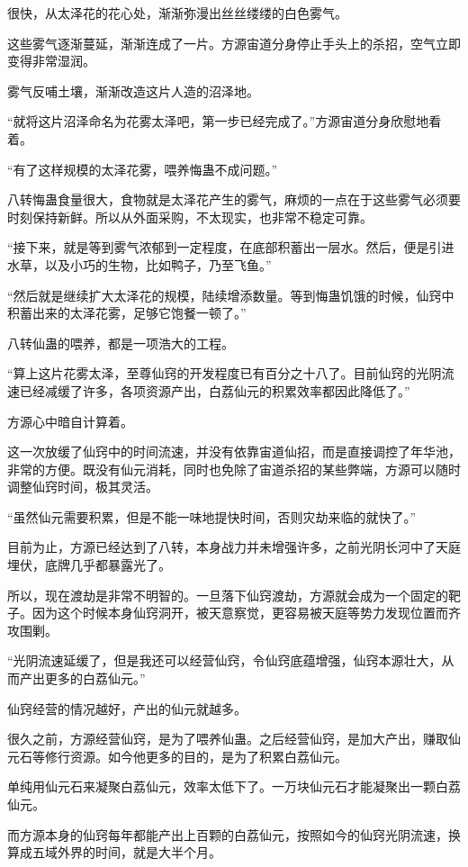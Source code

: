 \begin{this_body}
很快，从太泽花的花心处，渐渐弥漫出丝丝缕缕的白色雾气。

这些雾气逐渐蔓延，渐渐连成了一片。方源宙道分身停止手头上的杀招，空气立即变得非常湿润。

雾气反哺土壤，渐渐改造这片人造的沼泽地。

“就将这片沼泽命名为花雾太泽吧，第一步已经完成了。”方源宙道分身欣慰地看着。

“有了这样规模的太泽花雾，喂养悔蛊不成问题。”

八转悔蛊食量很大，食物就是太泽花产生的雾气，麻烦的一点在于这些雾气必须要时刻保持新鲜。所以从外面采购，不太现实，也非常不稳定可靠。

“接下来，就是等到雾气浓郁到一定程度，在底部积蓄出一层水。然后，便是引进水草，以及小巧的生物，比如鸭子，乃至飞鱼。”

“然后就是继续扩大太泽花的规模，陆续增添数量。等到悔蛊饥饿的时候，仙窍中积蓄出来的太泽花雾，足够它饱餐一顿了。”

八转仙蛊的喂养，都是一项浩大的工程。

“算上这片花雾太泽，至尊仙窍的开发程度已有百分之十八了。目前仙窍的光阴流速已经减缓了许多，各项资源产出，白荔仙元的积累效率都因此降低了。”

方源心中暗自计算着。

这一次放缓了仙窍中的时间流速，并没有依靠宙道仙招，而是直接调控了年华池，非常的方便。既没有仙元消耗，同时也免除了宙道杀招的某些弊端，方源可以随时调整仙窍时间，极其灵活。

“虽然仙元需要积累，但是不能一味地提快时间，否则灾劫来临的就快了。”

目前为止，方源已经达到了八转，本身战力并未增强许多，之前光阴长河中了天庭埋伏，底牌几乎都暴露光了。

所以，现在渡劫是非常不明智的。一旦落下仙窍渡劫，方源就会成为一个固定的靶子。因为这个时候本身仙窍洞开，被天意察觉，更容易被天庭等势力发现位置而齐攻围剿。

“光阴流速延缓了，但是我还可以经营仙窍，令仙窍底蕴增强，仙窍本源壮大，从而产出更多的白荔仙元。”

仙窍经营的情况越好，产出的仙元就越多。

很久之前，方源经营仙窍，是为了喂养仙蛊。之后经营仙窍，是加大产出，赚取仙元石等修行资源。如今他更多的目的，是为了积累白荔仙元。

单纯用仙元石来凝聚白荔仙元，效率太低下了。一万块仙元石才能凝聚出一颗白荔仙元。

而方源本身的仙窍每年都能产出上百颗的白荔仙元，按照如今的仙窍光阴流速，换算成五域外界的时间，就是大半个月。


\end{this_body}
